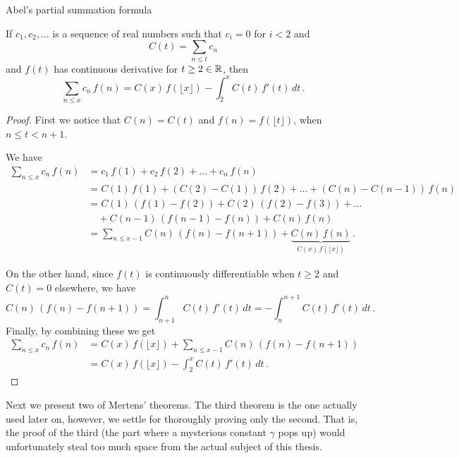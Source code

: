 \documentclass{article}
\begin{document}
\begin{lemma}
\label{lemma:abelsum}
Abel's partial summation formula \emph{\cite{HardyWright}}

If $c_1, c_2,\dots$ is a sequence of real numbers such that $c_i=0$ for $i<2$ and
\begin{equation*}
    C(t) = \sum_{n\leq t} c_n
\end{equation*}
and $f(t)$ has continuous derivative for $t \geq 2 \in \mathbb{R}$, then
\begin{equation*}
    \sum_{n\leq x} c_n\,f(n) = C(x)\,f(\lfloor x\rfloor)-\int_2^x C(t)\,f'(t)\,dt\,.
\end{equation*}

\begin{proof}
First we notice that $C(n) = C(t)$ and $f(n)=f(\lfloor t\rfloor)$, when $n\leq t < n+1$.

We have
\begin{align*}
    \sum_{n\leq x} c_n\,f(n) & = c_1\,f(1) + c_2\,f(2) + \dots + c_n\,f(n)\\
    & =  C(1)\,f(1) + (C(2)-C(1))\,f(2) + \dots + (C(n)-C(n-1))\,f(n)\\
    & = C(1)\,(f(1)-f(2)) + C(2)\,(f(2)-f(3)) + \dots\\
    & \quad + C(n-1)\,(f(n-1)-f(n)) + C(n)\,f(n)\\
    & = \sum_{n\leq x-1} C(n)\,(f(n)-f(n+1)) + \underbrace{C(n)\,f(n)}_\text{$C(x)\,f(\lfloor x\rfloor)$}\,.
\end{align*}

On the other hand, since $f(t)$ is continuously differentiable when $t\geq2$ and $C(t)=0$ elsewhere, we have
\begin{equation*}
     C(n)\,(f(n)-f(n+1)) = \int_{n+1}^n C(t)\,f'(t)\,dt = -\int_n^{n+1} C(t)\,f'(t)\,dt\,.
\end{equation*}
Finally, by combining these we get
\begin{align*}
    \sum_{n\leq x} c_n\,f(n) & = C(x)\,f(\lfloor x\rfloor) + \sum_{n\leq x-1} C(n)\,(f(n)-f(n+1))\\
    & = C(x)\,f(\lfloor x\rfloor)-\int_2^x C(t)\,f'(t)\,dt\,.
\end{align*}

\end{proof}
\end{lemma}

Next we present two of Mertens' theorems. The third theorem is the one actually used later on, however, we settle for thoroughly proving only the second. That is, the proof of the third (the part where a mysterious constant $\gamma$ pops up) would unfortunately steal too much space from the actual subject of this thesis.
\end{document}
